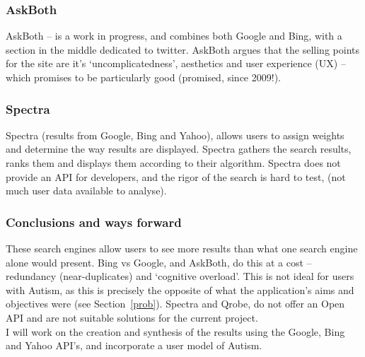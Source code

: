 \documentclass[10pt]{article}
\begin{document}
\subsubsection{AskBoth}
AskBoth – is a work in progress, and combines both Google and Bing, with a section in the middle dedicated to twitter. AskBoth argues that the selling points for the site are it’s ‘uncomplicatedness’, aesthetics and user experience (UX) – which promises to be particularly good (promised, since 2009!).

\subsubsection{Spectra}
Spectra (results from Google, Bing and Yahoo), allows users to assign weights and determine the way results are displayed. Spectra gathers the search results, ranks them and displays them according to their algorithm. Spectra does not provide an API for developers, and the rigor of the search is hard to test, (not much user data available to analyse).

\subsubsection{Conclusions and ways forward}
These search engines allow users to see more results than what one search engine alone would present. Bing vs Google, and AskBoth, do this at a cost -- redundancy (near-duplicates) and ‘cognitive overload’. This is not ideal for users with Autism, as this is precisely the opposite of what the application's aims and objectives were (see Section~\ref{prob}). Spectra and Qrobe, do not offer an Open API and are not suitable solutions for the current project. \\
I will work on the creation and synthesis of the results using the Google, Bing and Yahoo API's, and incorporate a user model of Autism.
\end{document}
